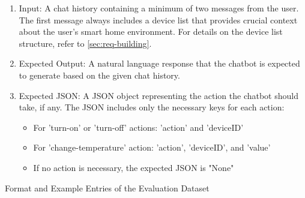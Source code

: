 \begin{enumerate}
    \item Input: A chat history containing a minimum of two messages from the user. The first message always includes a device list that provides crucial context about the user's smart home environment. For details on the device list structure, refer to \cref{sec:req-building}.
    \item Expected Output: A natural language response that the chatbot is expected to generate based on the given chat history.
    \item Expected JSON: A JSON object representing the action the chatbot should take, if any. The JSON includes only the necessary keys for each action:
    \begin{itemize}
    \item For 'turn-on' or 'turn-off' actions: 'action' and 'deviceID'
    \item For 'change-temperature' action: 'action', 'deviceID', and 'value'
    \item If no action is necessary, the expected JSON is "None"
    \end{itemize}
    \end{enumerate}

\begin{table}[htb]
    \centering
    \caption{Format and Example Entries of the Evaluation Dataset}
    \label{tab:dataset-format}
\end{table}
    
